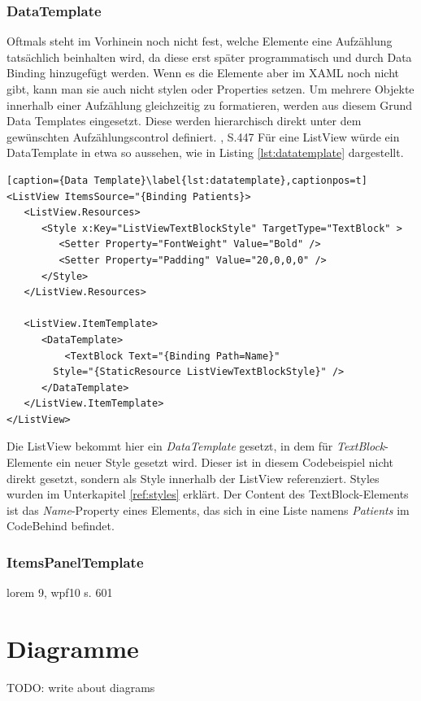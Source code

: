 \documentclass[a4paper,bibtotoc,oneside]{scrbook}
\begin{document}
\subsubsection[DataTemplate]{DataTemplate}\label{ref:datatemplate}
Oftmals steht im Vorhinein noch nicht fest, welche Elemente eine Aufzählung tatsächlich beinhalten wird, da diese erst später programmatisch und durch Data Binding hinzugefügt werden. Wenn es die Elemente aber im XAML noch nicht gibt, kann man sie auch nicht stylen oder Properties setzen.
\newline
\newline
Um mehrere Objekte innerhalb einer Aufzählung gleichzeitig zu formatieren, werden aus diesem Grund Data Templates eingesetzt. Diese werden hierarchisch direkt unter dem gewünschten Aufzählungscontrol definiert. \cite{ana12}, S.447
\newline
\newline
Für eine ListView würde ein DataTemplate in etwa so aussehen, wie in Listing \ref{lst:datatemplate} dargestellt.
\begin{lstlisting}[caption={Data Template}\label{lst:datatemplate},captionpos=t]
<ListView ItemsSource="{Binding Patients}>
   <ListView.Resources>
      <Style x:Key="ListViewTextBlockStyle" TargetType="TextBlock" >
         <Setter Property="FontWeight" Value="Bold" />
         <Setter Property="Padding" Value="20,0,0,0" />                         
      </Style>
   </ListView.Resources>

   <ListView.ItemTemplate>
      <DataTemplate>
          <TextBlock Text="{Binding Path=Name}"
		Style="{StaticResource ListViewTextBlockStyle}" />
      </DataTemplate>
   </ListView.ItemTemplate>
</ListView>
\end{lstlisting}
Die ListView bekommt hier ein \textit{DataTemplate} gesetzt, in dem für \textit{TextBlock}-Elemente ein neuer Style gesetzt wird. Dieser ist in diesem Codebeispiel nicht direkt gesetzt, sondern als Style innerhalb der ListView referenziert. Styles wurden im Unterkapitel \ref{ref:styles} erklärt. Der Content des TextBlock-Elements ist das \textit{Name}-Property eines Elements, das sich in eine Liste namens \textit{Patients} im CodeBehind befindet.

\subsubsection[ItemsPanelTemplate]{ItemsPanelTemplate}\label{itemspaneltemplate}
lorem 9, wpf10 s. 601

\section[Diagramme]{Diagramme}
TODO: write about diagrams
\end{document}
